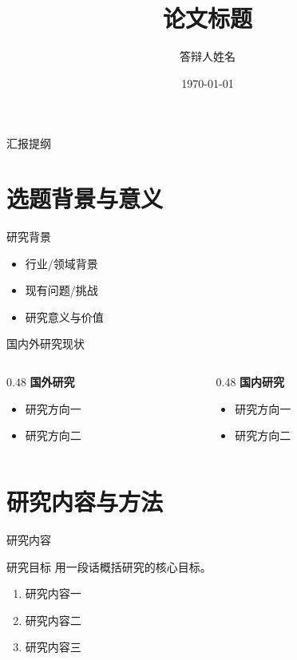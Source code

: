 \documentclass[
    aspectratio=169,
    fontset=windows,
]{ctexbeamer}
\title{论文标题}
\author{答辩人姓名}
\date{\today}
\begin{document}
\maketitle

\begin{frame}{汇报提纲}
  \tableofcontents[hideallsubsections]
\end{frame}

\section{选题背景与意义}

\begin{frame}{研究背景}
  \begin{itemize}
    \item 行业/领域背景
    \item 现有问题/挑战
    \item 研究意义与价值
  \end{itemize}
\end{frame}

\begin{frame}{国内外研究现状}
  \begin{columns}[T]
    \begin{column}{0.48\textwidth}
      \textbf{国外研究}
      \begin{itemize}
        \item 研究方向一
        \item 研究方向二
      \end{itemize}
    \end{column}
    \begin{column}{0.48\textwidth}
      \textbf{国内研究}
      \begin{itemize}
        \item 研究方向一
        \item 研究方向二
      \end{itemize}
    \end{column}
  \end{columns}
\end{frame}

\section{研究内容与方法}

\begin{frame}{研究内容}
  \begin{block}{研究目标}
    用一段话概括研究的核心目标。
  \end{block}

  \begin{enumerate}
    \item 研究内容一
    \item 研究内容二
    \item 研究内容三
  \end{enumerate}
\end{frame}
\end{document}
